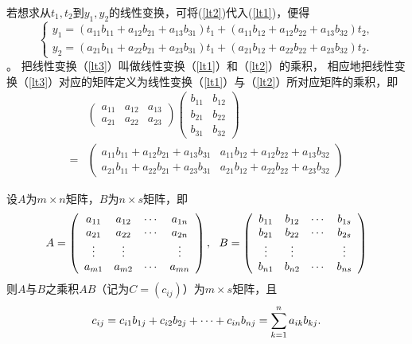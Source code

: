 若想求从$t_1, t_2$到$y_1, y_2$的线性变换，可将(\ref{lt2})代入(\ref{lt1})，便得
\begin{equation}\label{lt3}
  \left\{
    \begin{array}{l}
      y_1 = (a_{11}b_{11} + a_{12}b_{21} + a_{13}b_{31}) t_1 + (a_{11}b_{12} + a_{12}b_{22} + a_{13}b_{32})t_2, \\[0.2cm]
      y_2 = (a_{21}b_{11} + a_{22}b_{21} + a_{23}b_{31}) t_1 + (a_{21}b_{12} + a_{22}b_{22} + a_{23}b_{32})t_2.
    \end{array}
  \right.
\end{equation}
。
把线性变换（\ref{lt3}）叫做线性变换（\ref{lt1}）和（\ref{lt2}）的乘积，
相应地把线性变换（\ref{lt3}）对应的矩阵定义为线性变换（\ref{lt1}）与（\ref{lt2}）所对应矩阵的乘积，即
$$
\begin{array}{ll}
  & \left(
    \begin{array}{lll}
      a_{11} & a_{12} & a_{13}\\[0.1cm]
      a_{21} & a_{22} & a_{23}
    \end{array}
                        \right)
                        \left(
                        \begin{array}{ll}
                          b_{11} & b_{12} \\[0.1cm]
                          b_{21} & b_{22} \\[0.1cm]
                          b_{31} & b_{32} 
                        \end{array}
                                   \right) \\[0.8cm]
  = & \left(
      \begin{array}{cc}
        a_{11}b_{11} + a_{12}b_{21} + a_{13}b_{31}  &  a_{11}b_{12} + a_{12}b_{22} + a_{13}b_{32} \\[0.1cm]
        a_{21}b_{11} + a_{22}b_{21} + a_{23}b_{31}  &  a_{21}b_{12} + a_{22}b_{22} + a_{23}b_{32}
      \end{array}
                                                      \right)
\end{array}
$$
\begin{dingyi}[矩阵乘法]
  设$A$为$m\times n$矩阵，$B$为$n\times s$矩阵，即
  $$
  A = \left(
    \begin{array}{cccc}
      a_{11} & a_{12} & \cdots & a_{1n}\\
      a_{21} & a_{22} & \cdots & a_{2n}\\
      \vdots   & \vdots   &     & \vdots \\
      a_{m1} & a_{m2} & \cdots & a_{mn}
    \end{array}
  \right), ~~
  B = \left(
    \begin{array}{cccc}
      b_{11} & b_{12} & \cdots & b_{1s}\\
      b_{21} & b_{22} & \cdots & b_{2s}\\
      \vdots   & \vdots   &     & \vdots \\
      b_{n1} & b_{n2} & \cdots & b_{ns}
    \end{array}
  \right)
  $$
  则$A$与$B$之乘积$AB$（记为$C=(c_{ij})$）为$m\times s$矩阵，且
  $$
  c_{ij} = c_{i1}b_{1j} + c_{i2}b_{2j} + \cdots + c_{in}b_{nj} = \sum_{k=1}^na_{ik}b_{kj}.
  $$
\end{dingyi}
